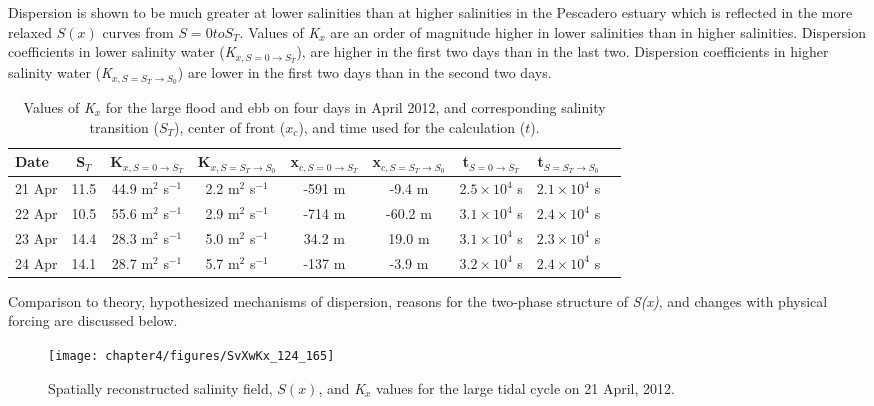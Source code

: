 Dispersion is shown to be much greater at lower salinities than at higher salinities in the Pescadero estuary which is reflected in the more relaxed $S(x)$ curves from $S=0 to S_T$.  Values of \emph{K$_x$} are an order of magnitude higher in lower salinities than in higher salinities. Dispersion coefficients in lower salinity water (\emph{K$_{x,S=0 \rightarrow S_T}$}), are higher in the first two days than in the last two. Dispersion coefficients in higher salinity water (\emph{K$_{x,S=S_T \rightarrow S_0}$}) are lower in the first two days than in the second two days. 

\begin{table}[h]
\renewcommand{\arraystretch}{1.3}

	\begin{center}
		\begin{tabular}{| l || c | c | c | c | c | c | c | c |}
		\hline
		Date & S$_{T}$ & K$_{x,S=0 \rightarrow S_T}$ &  K$_{x,S=S_T \rightarrow S_0}$ & x$_{c,S=0 \rightarrow S_T}$ & x$_{c,S=S_T \rightarrow S_0}$ & t$_{S=0 \rightarrow S_T}$ & t$_{S=S_T \rightarrow S_0}$\\
		\hline \hline
		21 Apr & 11.5 & 44.9 m$^2$ s$^{-1}$ & 2.2 m$^2$ s$^{-1}$ & -591 m & -9.4 m & $2.5\times10^4$ s & $2.1\times10^4$ s\\  
		22 Apr & 10.5 & 55.6 m$^2$ s$^{-1}$ & 2.9 m$^2$ s$^{-1}$ & -714 m & -60.2 m & $3.1\times10^4$ s & $2.4\times10^4$ s\\ 
		23 Apr & 14.4 & 28.3 m$^2$ s$^{-1}$ & 5.0 m$^2$ s$^{-1}$ & 34.2 m & 19.0 m & $3.1\times10^4$ s & $2.3\times10^4$ s\\ 
		24 Apr & 14.1 & 28.7 m$^2$ s$^{-1}$ & 5.7 m$^2$ s$^{-1}$ & -137 m & -3.9 m & $3.2\times10^4$ s & $2.4\times10^4$ s\\   \hline 
	\end{tabular}
	\caption{Values of \emph{K$_x$} for the large flood and ebb on four days in April 2012, and corresponding salinity transition ($S_T$), center of front ($x_c$), and time used for the calculation ($t$).} \label{tab:Kxtable}
\end{center}
\end{table}


Comparison to theory, hypothesized mechanisms of dispersion, reasons for the two-phase structure of \emph{S(x)}, and changes with physical forcing are discussed below. 
\begin{figure}[hp]
\centering
	\texttt{[image: chapter4/figures/SvXwKx\_124\_165]} 
\caption{Spatially reconstructed salinity field, $S(x)$, and \emph{K$_x$} values for the large tidal cycle on 21 April, 2012. } \label{fig:Kx421}
\end{figure}

